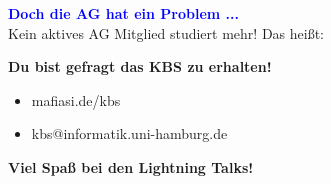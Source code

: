 \documentclass[t]{beamer}
\newcommand{\heading}[1]{{\Large\bfseries\vspace{1cm}\textcolor{blue}{#1}\\\vspace{0.65cm}}}
\begin{document}
	\begin{frame}[plain]
		\heading{Doch die AG hat ein Problem ...}
		\pause
		Kein aktives AG Mitglied studiert mehr!
		\pause
		\vspace{0.5cm}
		Das heißt:
		\begin{center}
			\textbf{Du bist gefragt das KBS zu erhalten!}
		\end{center}
		\pause
		\vspace{0.5cm}
		\begin{itemize}
			\item[\textrightarrow] mafiasi.de/kbs
			\item[\textrightarrow] kbs@informatik.uni-hamburg.de
		\end{itemize}
	\end{frame}
	
	\begin{frame}[c,plain]
		\vspace{1cm}
		\begin{center}
			\Large\textbf{Viel Spaß bei den Lightning Talks!}
		\end{center}
	\end{frame}
\end{document}
